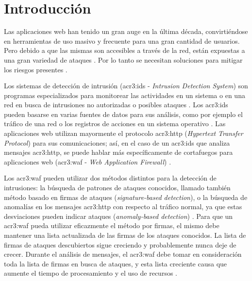 \section{Introducción}
\label{chap:p3_introduction}

Las aplicaciones web han tenido un gran auge en la última década,
convirtiéndose en herramientas de uso masivo y frecuente para una gran
cantidad de usuarios. Pero debido a que las mismas son accesibles a
través de la red, están expuestas a una gran variedad de ataques
\cite{gimenez2015tfg}. %
Por lo tanto se necesitan soluciones para mitigar los riesgos presentes
\cite{robertson2009detecting}. %

Los sistemas de detección de intrusión (\gls{acr3:ids} - \textit{Intrusion
Detection System}) son programas especializados para
monitorear las actividades en un sistema o en una red en busca de intrusiones
no autorizadas o posibles ataques
\cite{scarfone2007guide}. %
Los \gls{acr3:ids} pueden basarse en varias fuentes de datos para sus
análisis, como por ejemplo el tráfico de una red o los registros de
acciones en un sistema operativo
\cite{torranoGimenez2015study}. %
Las aplicaciones web utilizan mayormente el protocolo \gls{acr3:http}
(\textit{Hypertext Transfer Protocol}) \cite{fielding1999http} para sus
comunicaciones; así, en el caso de un \gls{acr3:ids} que analiza mensajes
\gls{acr3:http}, se puede hablar más específicamente de cortafuegos para
aplicaciones web (\gls{acr3:waf} - \textit{Web Application Firewall})
\cite{torranoGimenez2015study}. %

Los \gls{acr3:waf} pueden utilizar dos métodos distintos para la detección
de intrusiones: la búsqueda de patrones de ataques conocidos, llamado también
método basado en firmas de ataques (\textit{signature-based detection}),
o la búsqueda de anomalías en los mensajes \gls{acr3:http} con respecto al tráfico
normal, ya que estas desviaciones pueden indicar ataques
(\textit{anomaly-based detection})
\cite{torranoGimenez2015study}. %
Para que un \gls{acr3:waf} pueda utilizar eficazmente el método por
firmas, el mismo debe mantener una lista actualizada de
las firmas de los ataques conocidos. La lista de firmas de ataques
descubiertos sigue creciendo y probablemente nunca deje de crecer.
Durante el análisis de mensajes, el \gls{acr3:waf} debe tomar en
consideración toda la lista de firmas en busca de ataques, y esta lista
creciente causa que aumente el tiempo de procesamiento y el uso de recursos
\cite{kruegel2003anomaly}. %

